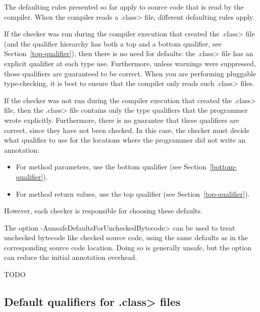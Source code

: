 The defaulting rules presented so far apply to source code that is read by
the compiler.  When the compiler reads a \<.class> file, different
defaulting rules apply.

If the checker was run during the compiler execution that created the
\<.class> file (and the qualifier hierarchy has both a top and a bottom
qualifier, see Section~\ref{top-qualifier}), then there is no need for
defaults:  the \<.class> file has an explicit qualifier at each type use.
Furthermore, unless warnings were suppressed, those qualifiers are
guaranteed to be correct.
When you are performing pluggable type-checking,
it is best to ensure that the compiler only reads such \<.class> files.

If the checker was not run during the compiler execution that created the
\<.class> file, then the \<.class> file contains only the type qualifiers
that the programmer wrote explicitly.  Furthermore, there is no guarantee
that these qualifiers are correct, since they have not been checked.
In this case, the checker must decide what qualifier to use for the
locations where the programmer did not write an annotation:
\begin{itemize}
\item
  For method parameters, use the bottom qualifier (see
  Section~\ref{bottom-qualifier}).
\item
  For method return values, use the top qualifier (see 
  Section~\ref{top-qualifier}).
\end{itemize}

However, each checker is responsible for choosing these defaults.

The option \<-AunsafeDefaultsForUncheckedBytecode> can be used to
treat unchecked bytecode like checked source code, using the same
defaults as in the corresponding source code location.
Doing so is generally unsafe, but the option can reduce the initial
annotation overhead.



\iffalse TODO
\subsection{Default qualifiers for \<.class> files\label{defaults-classfile}}


